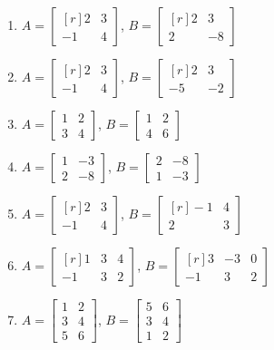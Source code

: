 \begin{enumerate}[start=150]
    \item $A=\begin{bmatrix*}[r]2 & 3 \\ -1 & 4\end{bmatrix*}$, $B=\begin{bmatrix*}[r]2 & 3 \\ 2 & -8\end{bmatrix*}$
    \item $A=\begin{bmatrix*}[r]2 & 3 \\ -1 & 4\end{bmatrix*}$, $B=\begin{bmatrix*}[r]2 & 3 \\ -5 & -2\end{bmatrix*}$
    \item $A=\begin{bmatrix*}1 & 2 \\ 3 & 4\end{bmatrix*}$, $B=\begin{bmatrix*}1 & 2 \\ 4 & 6\end{bmatrix*}$
    \item $A=\begin{bmatrix*}1 & -3 \\ 2 & -8\end{bmatrix*}$, $B=\begin{bmatrix*}2 & -8 \\ 1 & -3\end{bmatrix*}$
    \item $A=\begin{bmatrix*}[r]2 & 3 \\ -1 & 4\end{bmatrix*}$, $B=\begin{bmatrix*}[r]-1 & 4 \\ 2 & 3\end{bmatrix*}$
    \item $A=\begin{bmatrix*}[r]1 & 3 & 4 \\ -1 & 3 & 2\end{bmatrix*}$, $B=\begin{bmatrix*}[r]3 & -3 & 0 \\ -1 & 3 & 2\end{bmatrix*}$
    \item $A=\begin{bmatrix*}1 & 2 \\ 3 & 4 \\ 5 & 6\end{bmatrix*}$, $B=\begin{bmatrix*}5 & 6 \\ 3 & 4 \\ 1 & 2\end{bmatrix*}$

\end{enumerate}
